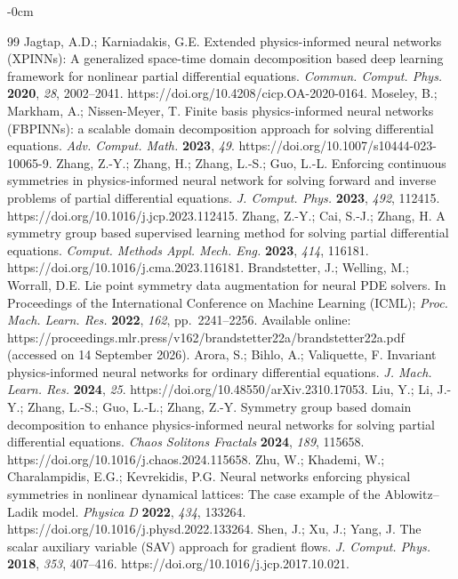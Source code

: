 \documentclass[symmetry,article,submit,moreauthors]{Definitions/mdpi}
\begin{document}
\begin{adjustwidth}{-\extralength}{0cm}
\begin{thebibliography}{99}
 Jagtap, A.D.; Karniadakis, G.E. Extended physics-informed neural networks (XPINNs): A generalized space-time domain decomposition based deep learning framework for nonlinear partial differential equations. \textit{Commun. Comput. Phys.} \textbf{2020}, \textit{28}, 2002--2041. https://doi.org/10.4208/cicp.OA-2020-0164.
 Moseley, B.; Markham, A.; Nissen-Meyer, T. Finite basis physics-informed neural networks (FBPINNs): a scalable domain decomposition approach for solving differential equations. \textit{Adv. Comput. Math.} \textbf{2023}, \textit{49}. https://doi.org/10.1007/s10444-023-10065-9.
 Zhang, Z.-Y.; Zhang, H.; Zhang, L.-S.; Guo, L.-L. Enforcing continuous symmetries in physics-informed neural network for solving forward and inverse problems of partial differential equations. \textit{J. Comput. Phys.} \textbf{2023}, \textit{492}, 112415. https://doi.org/10.1016/j.jcp.2023.112415.
 Zhang, Z.-Y.; Cai, S.-J.; Zhang, H. A symmetry group based supervised learning method for solving partial differential equations. \textit{Comput. Methods Appl. Mech. Eng.} \textbf{2023}, \textit{414}, 116181. https://doi.org/10.1016/j.cma.2023.116181.
 Brandstetter, J.; Welling, M.; Worrall, D.E. Lie point symmetry data augmentation for neural PDE solvers. In Proceedings of the International Conference on Machine Learning (ICML); \textit{Proc. Mach. Learn. Res.} \textbf{2022}, \textit{162}, pp.\ 2241--2256. Available online: https://proceedings.mlr.press/v162/brandstetter22a/brandstetter22a.pdf (accessed on 14 September 2026).
 Arora, S.; Bihlo, A.; Valiquette, F. Invariant physics-informed neural networks for ordinary differential equations. \textit{J. Mach. Learn. Res.} \textbf{2024}, \textit{25}. https://doi.org/10.48550/arXiv.2310.17053.
 Liu, Y.; Li, J.-Y.; Zhang, L.-S.; Guo, L.-L.; Zhang, Z.-Y. Symmetry group based domain decomposition to enhance physics-informed neural networks for solving partial differential equations. \textit{Chaos Solitons Fractals} \textbf{2024}, \textit{189}, 115658. https://doi.org/10.1016/j.chaos.2024.115658.
 Zhu, W.; Khademi, W.; Charalampidis, E.G.; Kevrekidis, P.G. Neural networks enforcing physical symmetries in nonlinear dynamical lattices: The case example of the Ablowitz--Ladik model. \textit{Physica D} \textbf{2022}, \textit{434}, 133264. https://doi.org/10.1016/j.physd.2022.133264.
 Shen, J.; Xu, J.; Yang, J. The scalar auxiliary variable (SAV) approach for gradient flows. \textit{J. Comput. Phys.} \textbf{2018}, \textit{353}, 407--416. https://doi.org/10.1016/j.jcp.2017.10.021.

\end{thebibliography}
\end{adjustwidth}
\end{document}
